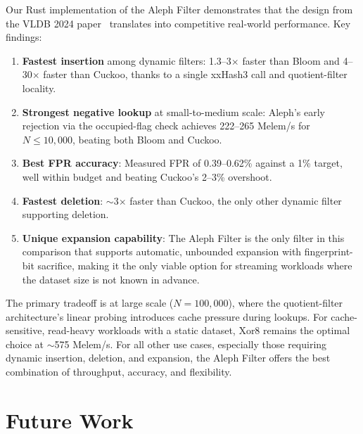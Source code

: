  Our Rust implementation of the Aleph Filter demonstrates that the design from the 
  VLDB 2024 paper~\cite{aleph} translates into competitive real-world performance.
  Key findings:

  \begin{enumerate}
    \item \textbf{Fastest insertion} among dynamic filters: 1.3--3$\times$ faster than
          Bloom and 4--30$\times$ faster than Cuckoo, thanks to a single xxHash3 call
          and quotient-filter locality.

    \item \textbf{Strongest negative lookup} at small-to-medium scale: Aleph's early
          rejection via the occupied-flag check achieves 222--265 Melem/s for 
          $N \leq 10{,}000$, beating both Bloom and Cuckoo.

    \item \textbf{Best FPR accuracy}: Measured FPR of 0.39--0.62\% against a 1\% target,
          well within budget and beating Cuckoo's 2--3\% overshoot.

    \item \textbf{Fastest deletion}: $\sim$3$\times$ faster than Cuckoo, the only other
          dynamic filter supporting deletion.

    \item \textbf{Unique expansion capability}: The Aleph Filter is the only filter in this
          comparison that supports automatic, unbounded expansion with fingerprint-bit
          sacrifice, making it the only viable option for streaming workloads where the
          dataset size is not known in advance.
  \end{enumerate}

  The primary tradeoff is at large scale ($N = 100{,}000$), where the quotient-filter
  architecture's linear probing introduces cache pressure during lookups. For
  cache-sensitive, read-heavy workloads with a static dataset, Xor8 remains the optimal
  choice at $\sim$575 Melem/s. For all other use cases, especially those requiring
  dynamic insertion, deletion, and expansion, the Aleph Filter offers the best
  combination of throughput, accuracy, and flexibility.


  \section{Future Work}

